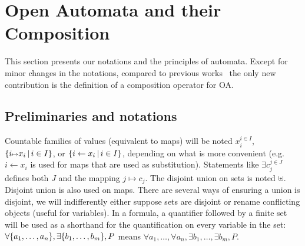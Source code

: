 \documentclass[runningheads]{llncs}
\begin{document}
\section{Open Automata and their Composition}\label{sec:background}

This section presents our notations and the principles of automata. Except for minor changes in the notations, compared to previous works~\cite{AMHEEMA:2023} the only new contribution is the definition of a composition operator for OA.
%



\subsection{Preliminaries and notations}
Countable families of values (equivalent to maps) will be noted \(x_i^{i \in I}\), \(\mset{i \mapsto x_i}{i \in I}\), or \({\left\{i \gets x_i\,\middle|\, i \in I\right\}}\), depending on what is more convenient (e.g. $i \gets x_i$ is used for maps that are used as substitution). Statements like  $\exists c_j^{j \in J}$ defines both $J$ and the mapping ${j \mapsto c_j}$.
The disjoint union on sets is noted \(\uplus\).
Disjoint union is also used on maps.
There are several ways of ensuring a union is disjoint, we will indifferently either suppose sets are disjoint or rename conflicting objects (useful for variables).
In a formula, a quantifier followed by a finite set will be used as a shorthand for the quantification on every variable in the set:
\(\forall {\left\{a_1, \dots, a_n\right\}}, \exists {\left\{b_1, \dots, b_m\right\}}, P\) means \(\forall a_1, \dots, \forall a_n, \exists b_1, \dots, \exists b_m, P\).
\end{document}
